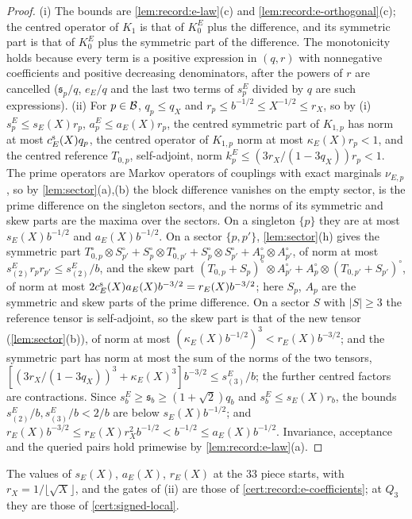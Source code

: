\begin{proof}
(i) The bounds are \cref{lem:record:e-law}(c) and \cref{lem:record:e-orthogonal}(c);
the centred operator of $K_1$ is that of $K^E_0$ plus the difference, and its
symmetric part is that of $K^E_0$ plus the symmetric part of the difference. The
monotonicity holds because every term is a positive expression in $(q,r)$ with
nonnegative coefficients and positive decreasing denominators, after the powers
of $r$ are cancelled ($\mathfrak s_p/q$, $e_E/q$ and the last two terms of $s^E_p$
divided by $q$ are such expressions).
(ii) For $p\in\mathcal B$, $q_p\le q_X$ and $r_p\le b^{-1/2}\le X^{-1/2}\le r_X$, so by (i)
$s^E_p\le s_E(X)r_p$, $a^E_p\le a_E(X)r_p$, the centred symmetric part of $K_{1,p}$
has norm at most $c^{\rm s}_E(X)q_p$, the centred operator of $K_{1,p}$ norm at most
$\kappa_E(X)r_p<1$, and the centred reference $T_{0,p}$, self-adjoint, norm
$k^E_p\le(3r_X/(1-3q_X))r_p<1$. The prime operators are Markov operators of
couplings with exact marginals $\nu_{E,p}$, so by \cref{lem:sector}(a),(b) the
block difference vanishes on the empty sector, is the prime difference on the
singleton sectors, and the norms of its symmetric and skew parts are the
maxima over the sectors. On a singleton $\{p\}$ they are at most
$s_E(X)b^{-1/2}$ and $a_E(X)b^{-1/2}$. On a sector $\{p,p'\}$,
\cref{lem:sector}(h) gives the symmetric part
$T^\circ_{0,p}\otimes S^\circ_{p'}+S^\circ_p\otimes T^\circ_{0,p'}+S^\circ_p\otimes S^\circ_{p'}
+A^\circ_p\otimes A^\circ_{p'}$, of norm at most $s^E_{(2)}r_pr_{p'}\le s^E_{(2)}/b$, and the
skew part $(T_{0,p}+S_p)^\circ\otimes A^\circ_{p'}+A^\circ_p\otimes(T_{0,p'}+S_{p'})^\circ$,
of norm at most $2c^{\rm s}_E(X)a_E(X)b^{-3/2}=r_E(X)b^{-3/2}$; here $S_p$, $A_p$ are
the symmetric and skew parts of the prime difference. On a sector $S$ with
$|S|\ge3$ the reference tensor is self-adjoint, so the skew part is that of the
new tensor (\cref{lem:sector}(b)), of norm at most $(\kappa_E(X)b^{-1/2})^3<
r_E(X)b^{-3/2}$; and the symmetric part has norm at most the sum of the norms of
the two tensors, $[(3r_X/(1-3q_X))^3+\kappa_E(X)^3]b^{-3/2}\le s^E_{(3)}/b$; the further
centred factors are contractions. Since $s^E_b\ge\mathfrak s_b\ge(1+\sqrt2)q_b$ and
$s^E_b\le s_E(X)r_b$, the bounds $s^E_{(2)}/b,s^E_{(3)}/b<2/b$ are below
$s_E(X)b^{-1/2}$; and $r_E(X)b^{-3/2}\le r_E(X)r_X^2b^{-1/2}<b^{-1/2}\le
a_E(X)b^{-1/2}$. Invariance, acceptance and the queried pairs hold primewise by
\cref{lem:record:e-law}(a).
\end{proof}

The values of $s_E(X)$, $a_E(X)$, $r_E(X)$ at the $33$ piece starts, with
$r_X=1/\lfloor\sqrt X\rfloor$, and the gates of (ii) are those of
\cref{cert:record:e-coefficients}; at $Q_3$ they are those of
\cref{cert:signed-local}.

